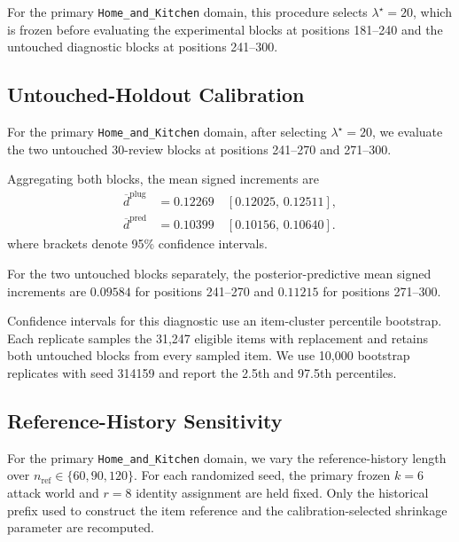 For the primary \texttt{Home\_and\_Kitchen} domain, this procedure selects
$\lambda^\star=20$, which is frozen before evaluating the experimental
blocks at positions 181--240 and the untouched diagnostic blocks at
positions 241--300.



\subsection{Untouched-Holdout Calibration}
\label{sec:supp-holdout}

For the primary \texttt{Home\_and\_Kitchen} domain, after selecting $\lambda^\star=20$, we evaluate the two untouched 30-review
blocks at positions 241--270 and 271--300.

Aggregating both blocks, the mean signed increments are
\[
\begin{aligned}
\overline d^{\mathrm{plug}}
&=
0.12269
\quad
[0.12025,\,0.12511],\\
\overline d^{\mathrm{pred}}
&=
0.10399
\quad
[0.10156,\,0.10640].
\end{aligned}
\]
where brackets denote 95\% confidence intervals.

For the two untouched blocks separately, the posterior-predictive mean signed
increments are $0.09584$ for positions 241--270 and $0.11215$ for positions
271--300.

Confidence intervals for this diagnostic use an item-cluster percentile
bootstrap. Each replicate samples the 31,247 eligible items with replacement
and retains both untouched blocks from every sampled item. We use 10,000
bootstrap replicates with seed 314159 and report the 2.5th and 97.5th
percentiles.



\subsection{Reference-History Sensitivity}
\label{sec:supp-reference-history}

For the primary \texttt{Home\_and\_Kitchen} domain, we vary the reference-history length over
$n_{\mathrm{ref}}\in\{60,90,120\}$.
For each randomized seed, the primary frozen $k=6$ attack world and $r=8$ identity assignment are held fixed. Only the historical prefix used to construct the
item reference and the calibration-selected shrinkage parameter are
recomputed.

